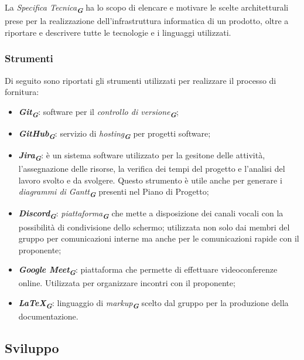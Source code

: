 La \emph{Specifica Tecnica}\textsubscript{\textit{\textbf{G}}} ha lo scopo di elencare e motivare le scelte architetturali prese per
la realizzazione dell’infrastruttura informatica di un prodotto, oltre a riportare e descrivere tutte le tecnologie e i linguaggi utilizzati.


\subsubsection{Strumenti}

Di seguito sono riportati gli strumenti utilizzati per realizzare il processo di fornitura:
\begin{itemize}
    \item \textbf{\emph{Git}}\textsubscript{\textit{\textbf{G}}}: software per il \emph{controllo di versione}\textsubscript{\textit{\textbf{G}}};
    \item \textbf{\emph{GitHub}}\textsubscript{\textit{\textbf{G}}}: servizio di \emph{hosting}\textsubscript{\textit{\textbf{G}}} per progetti software;
    \item \textbf{\emph{Jira}}\textsubscript{\textit{\textbf{G}}}: è un sistema software utilizzato per la gesitone delle attività, l’assegnazione delle
    risorse, la verifica dei tempi del progetto e l’analisi del lavoro svolto e da svolgere.
    Questo strumento è utile anche per generare i \emph{diagrammi di Gantt}\textsubscript{\textit{\textbf{G}}} presenti nel Piano
    di Progetto;
    \item \textbf{\emph{Discord}}\textsubscript{\textit{\textbf{G}}}: \emph{piattaforma}\textsubscript{\textit{\textbf{G}}} che mette a disposizione dei canali vocali con la possibilità di condivisione dello schermo;
    utilizzata non solo dai membri del gruppo per comunicazioni interne ma anche per le comunicazioni rapide con il proponente;
    \item \textbf{\emph{Google Meet}}\textsubscript{\textit{\textbf{G}}}: piattaforma che permette di effettuare videoconferenze online. Utilizzata per organizzare incontri con il proponente;
    \item \textbf{\emph{\LaTeX}}\textsubscript{\textit{\textbf{G}}}: linguaggio di \emph{markup}\textsubscript{\textit{\textbf{G}}} scelto dal gruppo per la produzione della documentazione.
\end{itemize}

\subsection{Sviluppo}
